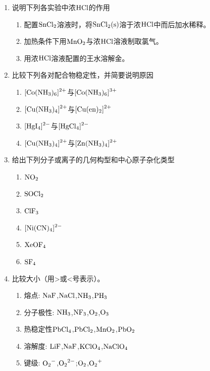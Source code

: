 \begin{enumerate}[label=\arabic*., start=1, itemsep=1.5ex]
    \item 说明下列各实验中浓$\ce{HCl}$的作用
    \begin{enumerate}[label=(\arabic*), itemsep=1ex]
        \item 配置$\ce{SnCl2}$溶液时，将$\ce{SnCl2(s)}$溶于浓$\ce{HCl}$中而后加水稀释。
        \item 加热条件下用$\ce{MnO2}$与浓$\ce{HCl}$溶液制取氯气。
        \item 用浓$\ce{HCl}$溶液配置的王水溶解金。
    \end{enumerate}
    \item 比较下列各对配合物稳定性，并简要说明原因
    \begin{enumerate}[label=(\arabic*), itemsep=1ex]
        \item $\ce{[Co(NH3)6]^2+}$与$\ce{[Co(NH3)6]^3+}$
        \item $\ce{[Cu(NH3)4]^2+}$与$\ce{[Cu(en)2]^2+}$
        \item $\ce{[HgI4]^2-}$与$\ce{[HgCl4]^2-}$
        \item $\ce{[Cu(NH3)4]^2+}$与$\ce{[Zn(NH3)4]^2+}$
    \end{enumerate}
    \item 给出下列分子或离子的几何构型和中心原子杂化类型
    \begin{enumerate}[label=(\arabic*), itemsep=1ex]
        \item $\ce{NO2}$
        \item $\ce{SOCl2}$
        \item $\ce{ClF3}$
        \item $\ce{[Ni(CN)4]^2-}$
        \item $\ce{XeOF4}$
        \item $\ce{SF4}$
    \end{enumerate}
    \item 比较大小（用>或<号表示）。
    \begin{enumerate}[label=(\arabic*), itemsep=1ex]
        \item 熔点: $\ce{NaF}$,$\ce{NaCl}$,$\ce{NH3}$,$\ce{PH3}$
        \item 分子极性: $\ce{NH3}$,$\ce{NF3}$,$\ce{O2}$,$\ce{O3}$
        \item 热稳定性$\ce{PbCl4}$,$\ce{PbCl2}$,$\ce{MnO2}$,$\ce{PbO2}$
        \item 溶解度: $\ce{LiF}$,$\ce{NaF}$,$\ce{KClO4}$,$\ce{NaClO4}$
        \item 键级: $\ce{O2^-}$,$\ce{O2^{2-}}$;$\ce{O2}$,$\ce{O2^+}$

\end{enumerate}
\end{enumerate}
